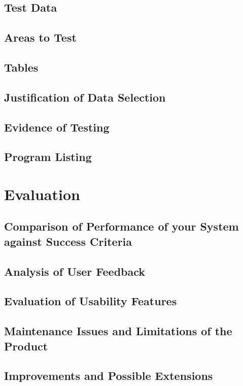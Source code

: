 \documentclass[11pt]{article}
\begin{document}
        \subsection{Test Data}
        \subsection{Areas to Test}
        \subsection{Tables}
        \subsection{Justification of Data Selection}
        \subsection{Evidence of Testing}
        \subsection{Program Listing}
    
    \section{Evaluation}
        \subsection{Comparison of Performance of your System against Success Criteria}
        \subsection{Analysis of User Feedback}
        \subsection{Evaluation of Usability Features}
        \subsection{Maintenance Issues and Limitations of the Product}
        \subsection{Improvements and Possible Extensions}
        
\end{document}
